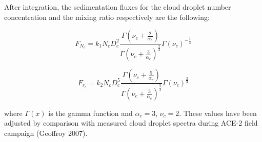 After integration, the sedimentation fluxes for the cloud droplet number concentration and the mixing ratio respectively are the following:

\begin{equation}
F_{N_c}=k_1N_cD_c^2\frac{\Gamma(\nu_c+\frac{2}{\alpha_c})}{\Gamma(\nu_c+\frac{3}{\alpha_c})^{\frac{2}{3}}}\Gamma(\nu_c)^{-\frac{1}{3}}
\end{equation}

\begin{equation}
F_{r_c}=k_2N_cD_c^5\frac{\Gamma(\nu_c+\frac{5}{\alpha_c})}{\Gamma(\nu_c+\frac{3}{\alpha_c})^{\frac{5}{3}}}\Gamma(\nu_c)^{\frac{2}{3}}
\end{equation}

\noindent where $\Gamma(x)$ is the gamma function and $\alpha_c=3$, $\nu_c=2$. These values have been adjusted by comparison with measured cloud droplet spectra during ACE-2 field campaign (Geoffroy 2007).




